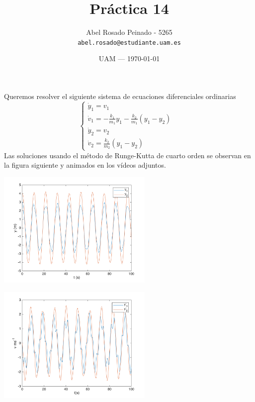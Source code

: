 \documentclass{article}
\title{Práctica 14} %
\author{Abel Rosado Peinado - 5265\\ \texttt{abel.rosado@estudiante.uam.es}} %
\date{UAM --- \today} %
\begin{document}
\maketitle %
\noindent Queremos resolver el siguiente sistema de ecuaciones diferenciales ordinarias
\[\left\{\begin{matrix}
	\dot{y}_1 = v_1 \phantom{---------} \\ \dot{v}_1 =-\frac{k_1}{m_1}y_1-\frac{k_2}{m_1}(y_1-y_2) \\
	\dot{y}_2 = v_2 \phantom{---------} \\ \dot{v}_2 =\frac{k_2}{m_2}(y_1-y_2)  \phantom{-----}
\end{matrix}\right.\]
Las soluciones usando el método de Runge-Kutta de cuarto orden se observan en la figura siguiente y animados en los vídeos adjuntos.

\begin{minipage}{8cm}
	\centering
	\includegraphics[width=7.5cm]{untitled.png}
  \end{minipage}%
  \begin{minipage}{8cm}
	\centering
	\includegraphics[width=7.5cm]{untitled1.png}
  \end{minipage}
\end{document}

